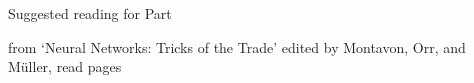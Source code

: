 %
%
%

\begin{frame}{Suggested reading for Part \thispart}

{
\small
from `Neural Networks: Tricks of the Trade' 
\cite{Montavon:2012TricksOfTrade}
edited by Montavon, Orr, and Müller, read pages
}
    

\end{frame}
